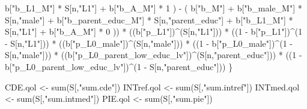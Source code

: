 \documentclass[
]{book}
\newenvironment{Shaded}{\begin{snugshade}}{\end{snugshade}}
\newcommand{\DecValTok}[1]{\textcolor[rgb]{0.00,0.00,0.81}{#1}}
\newcommand{\FunctionTok}[1]{\textcolor[rgb]{0.00,0.00,0.00}{#1}}
\newcommand{\NormalTok}[1]{#1}
\newcommand{\OtherTok}[1]{\textcolor[rgb]{0.56,0.35,0.01}{#1}}
\newcommand{\SpecialCharTok}[1]{\textcolor[rgb]{0.00,0.00,0.00}{#1}}
\newcommand{\StringTok}[1]{\textcolor[rgb]{0.31,0.60,0.02}{#1}}
\begin{document}
\begin{Shaded}
\begin{Highlighting}[]
\NormalTok{            b[}\StringTok{"b\_L1\_M"}\NormalTok{] }\SpecialCharTok{*}\NormalTok{ S[n,}\StringTok{"L1"}\NormalTok{] }\SpecialCharTok{+}
\NormalTok{            b[}\StringTok{"b\_A\_M"}\NormalTok{] }\SpecialCharTok{*} \DecValTok{1}\NormalTok{ ) }\SpecialCharTok{{-}} 
\NormalTok{          ( b[}\StringTok{"b\_M"}\NormalTok{] }\SpecialCharTok{+} 
\NormalTok{              b[}\StringTok{"b\_male\_M"}\NormalTok{] }\SpecialCharTok{*}\NormalTok{ S[n,}\StringTok{"male"}\NormalTok{] }\SpecialCharTok{+} 
\NormalTok{              b[}\StringTok{"b\_parent\_educ\_M"}\NormalTok{] }\SpecialCharTok{*}\NormalTok{ S[n,}\StringTok{"parent\_educ"}\NormalTok{] }\SpecialCharTok{+} 
\NormalTok{              b[}\StringTok{"b\_L1\_M"}\NormalTok{] }\SpecialCharTok{*}\NormalTok{ S[n,}\StringTok{"L1"}\NormalTok{] }\SpecialCharTok{+}
\NormalTok{              b[}\StringTok{"b\_A\_M"}\NormalTok{] }\SpecialCharTok{*} \DecValTok{0}\NormalTok{ )) }\SpecialCharTok{*} 
\NormalTok{      ((b[}\StringTok{"p\_L1"}\NormalTok{])}\SpecialCharTok{\^{}}\NormalTok{(S[n,}\StringTok{"L1"}\NormalTok{])) }\SpecialCharTok{*}
\NormalTok{      ((}\DecValTok{1} \SpecialCharTok{{-}}\NormalTok{ b[}\StringTok{"p\_L1"}\NormalTok{])}\SpecialCharTok{\^{}}\NormalTok{(}\DecValTok{1} \SpecialCharTok{{-}}\NormalTok{ S[n,}\StringTok{"L1"}\NormalTok{])) }\SpecialCharTok{*}
\NormalTok{      ((b[}\StringTok{"p\_L0\_male"}\NormalTok{])}\SpecialCharTok{\^{}}\NormalTok{(S[n,}\StringTok{"male"}\NormalTok{])) }\SpecialCharTok{*} 
\NormalTok{      ((}\DecValTok{1} \SpecialCharTok{{-}}\NormalTok{ b[}\StringTok{"p\_L0\_male"}\NormalTok{])}\SpecialCharTok{\^{}}\NormalTok{(}\DecValTok{1} \SpecialCharTok{{-}}\NormalTok{ S[n,}\StringTok{"male"}\NormalTok{])) }\SpecialCharTok{*} 
\NormalTok{      ((b[}\StringTok{"p\_L0\_parent\_low\_educ\_lv"}\NormalTok{])}\SpecialCharTok{\^{}}\NormalTok{(S[n,}\StringTok{"parent\_educ"}\NormalTok{])) }\SpecialCharTok{*}
\NormalTok{      ((}\DecValTok{1} \SpecialCharTok{{-}}\NormalTok{ b[}\StringTok{"p\_L0\_parent\_low\_educ\_lv"}\NormalTok{])}\SpecialCharTok{\^{}}\NormalTok{(}\DecValTok{1} \SpecialCharTok{{-}}\NormalTok{ S[n,}\StringTok{"parent\_educ"}\NormalTok{])) }
\NormalTok{    \}}
  
\NormalTok{  CDE.qol }\OtherTok{\textless{}{-}} \FunctionTok{sum}\NormalTok{(S[,}\StringTok{"sum.cde"}\NormalTok{])}
\NormalTok{  INTref.qol }\OtherTok{\textless{}{-}} \FunctionTok{sum}\NormalTok{(S[,}\StringTok{"sum.intref"}\NormalTok{])}
\NormalTok{  INTmed.qol }\OtherTok{\textless{}{-}} \FunctionTok{sum}\NormalTok{(S[,}\StringTok{"sum.intmed"}\NormalTok{])}
\NormalTok{  PIE.qol }\OtherTok{\textless{}{-}} \FunctionTok{sum}\NormalTok{(S[,}\StringTok{"sum.pie"}\NormalTok{])}
  

\end{Highlighting}
\end{Shaded}
\end{document}
